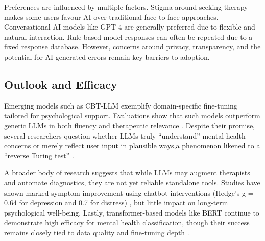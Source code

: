 Preferences are influenced by multiple factors. Stigma around seeking therapy makes some users favour AI over traditional face-to-face approaches. Conversational AI models like GPT-4 are generally preferred due to flexible and natural interaction. Rule-based model responses can often be repeated due to a fixed response database. However, concerns around privacy, transparency, and the potential for AI-generated errors remain key barriers to adoption.

\subsection{Outlook and Efficacy}

Emerging models such as CBT-LLM exemplify domain-specific fine-tuning tailored for psychological support. Evaluations show that such models outperform generic LLMs in both fluency and therapeutic relevance \cite{na2024}. Despite their promise, several researchers question whether LLMs truly “understand” mental health concerns or merely reflect user input in plausible ways,a phenomenon likened to a “reverse Turing test” \cite{sejnowski2023}.

A broader body of research suggests that while LLMs may augment therapists and automate diagnostics, they are not yet reliable standalone tools. Studies have shown marked symptom improvement using chatbot interventions (Hedge’s g = 0.64 for depression and 0.7 for distress) \cite{stade2024}, but little impact on long-term psychological well-being. Lastly, transformer-based models like BERT continue to demonstrate high efficacy for mental health classification, though their success remains closely tied to data quality and fine-tuning depth \cite{greco2023, li2023}.